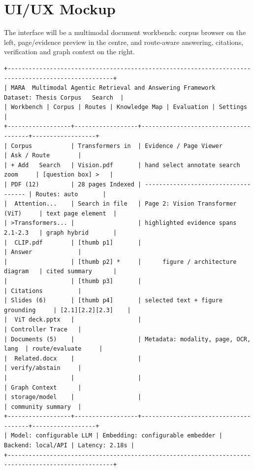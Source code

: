 \documentclass{article}
\begin{document}
\section{UI/UX Mockup}

The interface will be a multimodal document workbench: corpus browser on the left, page/evidence preview in the centre, and route-aware answering, citations, verification and graph context on the right.

\begin{Verbatim}[fontsize=\tiny]
+----------------------------------------------------------------------------------------------------+
| MARA  Multimodal Agentic Retrieval and Answering Framework      Dataset: Thesis Corpus   Search  |
| Workbench | Corpus | Routes | Knowledge Map | Evaluation | Settings                              |
+------------------+------------------+--------------------------------------+------------------+
| Corpus           | Transformers in  | Evidence / Page Viewer               | Ask / Route        |
| + Add   Search   | Vision.pdf       | hand select annotate search zoom     | [question box] >   |
| PDF (12)         | 28 pages Indexed | ------------------------------------ | Routes: auto       |
|  Attention...    | Search in file   | Page 2: Vision Transformer (ViT)     | text page element  |
| >Transformers... |                  | highlighted evidence spans 2.1-2.3   | graph hybrid       |
|  CLIP.pdf        | [thumb p1]       |                                      | Answer             |
|                  | [thumb p2] *     |      figure / architecture diagram   | cited summary      |
|                  | [thumb p3]       |                                      | Citations          |
| Slides (6)       | [thumb p4]       | selected text + figure grounding     | [2.1][2.2][2.3]    |
|  ViT deck.pptx   |                  |                                      | Controller Trace   |
| Documents (5)    |                  | Metadata: modality, page, OCR, lang  | route/evaluate     |
|  Related.docx    |                  |                                      | verify/abstain     |
|                  |                  |                                      | Graph Context      |
| storage/model    |                  |                                      | community summary  |
+------------------+------------------+--------------------------------------+------------------+
| Model: configurable LLM | Embedding: configurable embedder | Backend: local/API | Latency: 2.18s |
+----------------------------------------------------------------------------------------------------+
\end{Verbatim}
\end{document}
